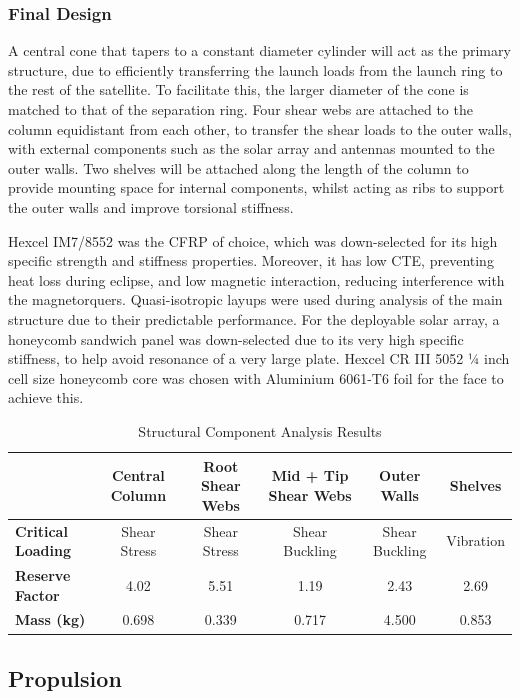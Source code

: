 \documentclass[a4paper, 11pt, conference]{IEEEtran}
\begin{document}
\subsubsection{Final Design}
A central cone that tapers to a constant diameter cylinder will act as the primary structure, due to efficiently transferring the launch loads from the launch ring to the rest of the satellite. To facilitate this, the larger diameter of the cone is matched to that of the separation ring. Four shear webs are attached to the column equidistant from each other, to transfer the shear loads to the outer walls, with external components such as the solar array and antennas mounted to the outer walls. Two shelves will be attached along the length of the column to provide mounting space for internal components, whilst acting as ribs to support the outer walls and improve torsional stiffness.

Hexcel IM7/8552 \cite{IM7/8552} was the CFRP of choice, which was down-selected for its high specific strength and stiffness properties. Moreover, it has low CTE, preventing heat loss during eclipse, and low magnetic interaction, reducing interference with the magnetorquers. Quasi-isotropic layups were used during analysis of the main structure due to their predictable performance. For the deployable solar array, a honeycomb sandwich panel was down-selected due to its very high specific stiffness, to help avoid resonance of a very large plate. Hexcel CR III 5052 ¼ inch cell size honeycomb core \cite{hexwebcr3} was chosen with Aluminium 6061-T6 \cite{Al-6061-T6} foil for the face to achieve this.

\begin{table}[h!]
\centering
\caption{Structural Component Analysis Results}
\label{tab:structural_analysis}
\begin{tabular}{@{}lccccc@{}}
\toprule
& \textbf{Central Column} & \textbf{Root Shear Webs} & \textbf{Mid + Tip Shear Webs} & \textbf{Outer Walls} & \textbf{Shelves} \\
\midrule
\textbf{Critical Loading} & Shear Stress & Shear Stress & Shear Buckling & Shear Buckling & Vibration \\
\midrule
\textbf{Reserve Factor} & 4.02 & 5.51 & 1.19 & 2.43 & 2.69 \\
\textbf{Mass (kg)} & 0.698 & 0.339 & 0.717 & 4.500 & 0.853 \\
\bottomrule
\end{tabular}
\end{table}

\subsection{Propulsion}
\end{document}
